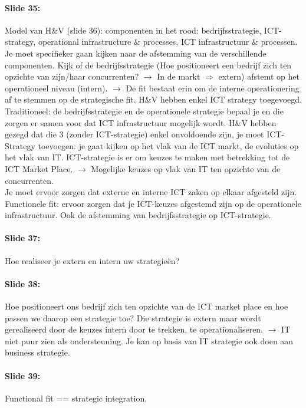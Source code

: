 \documentclass[10pt,a4paper]{report}
\begin{document}
\paragraph{Slide 35:}Model van H\&V (slide 36): componenten in het rood: bedrijfsstrategie, ICT-strategy, operational infrastructure \& processes, ICT infrastructuur \& processen. 
Je moet specifieker gaan kijken naar de afstemming van de verschillende componenten. 
Kijk of de bedrijfsstrategie (Hoe positioneert een bedrijf zich ten opzichte van zijn/haar concurrenten? $\rightarrow$ In de markt $\Rightarrow$ extern) afstemt op het operationeel niveau (intern). $\rightarrow$ 
De fit bestaat erin om de interne operationering af te stemmen op de strategische fit. H\&V hebben enkel ICT strategy toegevoegd.\\ 
Traditioneel: de bedrijfsstrategie en de operationele strategie bepaal je en die zorgen er samen voor dat ICT infrastructuur mogelijk wordt.
H\&V hebben gezegd dat die 3 (zonder ICT-strategie) enkel onvoldoende zijn, je moet ICT-Strategy toevoegen: je gaat kijken op het vlak van de ICT markt, de evoluties op het vlak van IT. 
ICT-strategie is er om keuzes te maken met betrekking tot de ICT Market Place. $\rightarrow$ Mogelijke keuzes op vlak van IT ten opzichte van de concurrenten.\\
Je moet ervoor zorgen dat externe en interne ICT zaken op elkaar afgesteld zijn.\\
Functionele fit: ervoor zorgen dat je ICT-keuzes afgestemd zijn op de operationele infrastructuur. Ook de afstemming van bedrijfsstrategie op ICT-strategie.

\paragraph{Slide 37:}Hoe realiseer je extern en intern uw strategieën?

\paragraph{Slide 38:}Hoe positioneert ons bedrijf zich ten opzichte van de ICT market place en hoe passen we daarop een strategie toe? 
Die strategie is extern maar wordt gerealiseerd door de keuzes intern door te trekken, te operationaliseren. 
$\rightarrow$ IT niet puur zien als ondersteuning. Je kan op basis van IT strategie ook doen aan business strategie.

\paragraph{Slide 39:}Functional fit == strategic integration.
\end{document}

